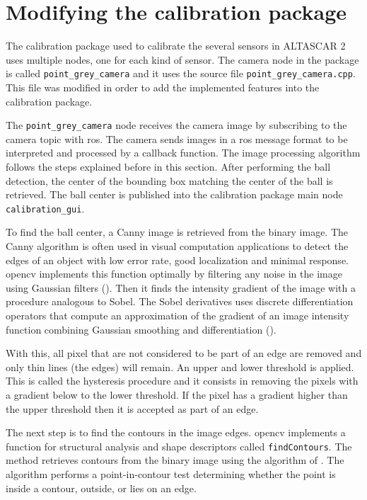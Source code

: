 \section{Modifying the calibration package}

The calibration package used to calibrate the several sensors in ALTASCAR 2 uses multiple nodes, one for each kind of sensor. The camera node in the package is called \texttt{point\_grey\_camera} and it uses the source file \texttt{point\_grey\_camera.cpp}. This file was modified in order to add the implemented features into the calibration package. 

The \texttt{point\_grey\_camera} node receives the camera image by subscribing to the camera topic with \gls{ros}. The camera sends images in a \gls{ros} message format to be interpreted and processed by a callback function. The image processing algorithm follows the steps explained before in this section. After performing the ball detection, the center of the bounding box matching the center of the ball is retrieved. The ball center is published into the calibration package main node \texttt{calibration\_gui}.

To find the ball center, a Canny image is retrieved from the binary image. The Canny algorithm is often used in visual computation applications to detect the edges of an object with low error rate, good localization and minimal response. \gls{opencv} implements this function optimally by filtering any noise in the image using Gaussian filters (\cite{OpenCV2.4.13.6documentationa}). Then it finds the intensity gradient of the image with a procedure analogous to Sobel. The Sobel derivatives uses discrete differentiation operators that compute an approximation of the gradient of an image intensity function combining Gaussian smoothing and differentiation (\cite{OpenCV2.4.13.6documentationb}). 

With this, all pixel that are not considered to be part of an edge are removed and only thin lines (the edges) will remain. An upper and lower threshold is applied. This is called the hysteresis procedure and it consists in removing the pixels with a gradient below to the lower threshold. If the pixel has a gradient higher than the upper threshold then it is accepted as part of an edge.

The next step is to find the contours in the image edges. \gls{opencv} implements a function for structural analysis and shape descriptors called \texttt{findContours}. The method retrieves contours from the binary image using the algorithm of \cite{Suzuki1985}. The algorithm performs a point-in-contour test determining whether the point is inside a contour, outside, or lies on an edge. 

